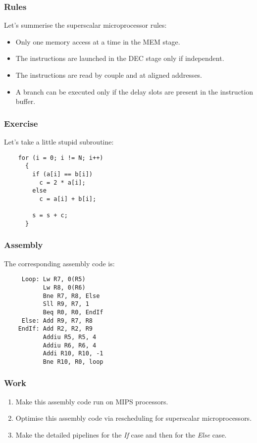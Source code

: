 
\begin{frame}
  \frametitle{Rules}

  Let's summerise the superscalar microprocessor rules:

  \begin{itemize}[<+->]
    \item
      Only one memory access at a time in the MEM stage.
    \item
      The instructions are launched in the DEC stage only if independent.
    \item
      The instructions are read by couple and at aligned addresses.
    \item
      A branch can be executed only if the delay slots are present in the
      instruction buffer.
  \end{itemize}
\end{frame}


\begin{frame}[containsverbatim]
  \frametitle{Exercise}

  Let's take a little stupid subroutine:

  \begin{verbatim}
    for (i = 0; i != N; i++)
      {
        if (a[i] == b[i])
          c = 2 * a[i];
        else
          c = a[i] + b[i];

        s = s + c;
      }
  \end{verbatim}
\end{frame}


\begin{frame}[containsverbatim]
  \frametitle{Assembly}

  The corresponding assembly code is:

  \begin{verbatim}
     Loop: Lw R7, 0(R5)
           Lw R8, 0(R6)
           Bne R7, R8, Else
           Sll R9, R7, 1
           Beq R0, R0, EndIf
     Else: Add R9, R7, R8
    EndIf: Add R2, R2, R9
           Addiu R5, R5, 4
           Addiu R6, R6, 4
           Addi R10, R10, -1
           Bne R10, R0, loop
  \end{verbatim}
\end{frame}


\begin{frame}
  \frametitle{Work}

  \begin{enumerate}[<+->]
    \item
      Make this assembly code run on MIPS processors.
    \item
      Optimise this assembly code via rescheduling for superscalar
      microprocessors.
    \item
      Make the detailed pipelines for the \textit{If} case and then for
      the \textit{Else} case.
  \end{enumerate}
\end{frame}

